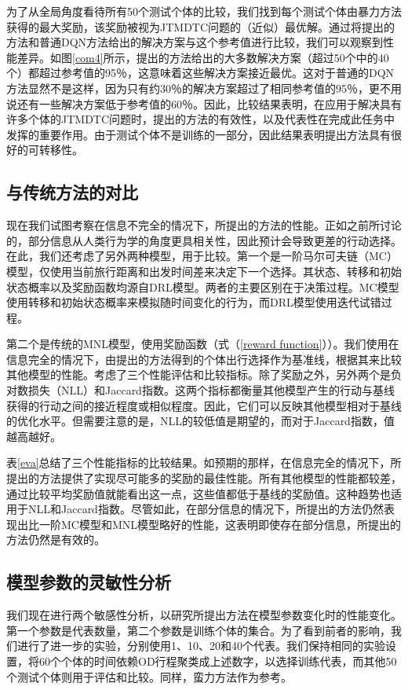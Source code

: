 为了从全局角度看待所有50个测试个体的比较，我们找到每个测试个体由暴力方法获得的最大奖励，该奖励被视为JTMDTC问题的（近似）最优解。通过将提出的方法和普通DQN方法给出的解决方案与这个参考值进行比较，我们可以观察到性能差异。如图\ref{com4}所示，提出的方法给出的大多数解决方案（超过50个中的40个）都超过参考值的95％，这意味着这些解决方案接近最优。这对于普通的DQN方法显然不是这样，因为只有约30％的解决方案超过了相同参考值的95％，更不用说还有一些解决方案低于参考值的60％。因此，比较结果表明，在应用于解决具有许多个体的JTMDTC问题时，提出的方法的有效性，以及代表性在完成此任务中发挥的重要作用。由于测试个体不是训练的一部分，因此结果表明提出方法具有很好的可转移性。

\subsection{与传统方法的对比}

现在我们试图考察在信息不完全的情况下，所提出的方法的性能。正如之前所讨论的，部分信息从人类行为学的角度更具相关性，因此预计会导致更差的行动选择。在此，我们还考虑了另外两种模型，用于比较。第一个是一阶马尔可夫链（MC）模型，仅使用当前旅行距离和出发时间差来决定下一个选择。其状态、转移和初始状态概率以及奖励函数均源自DRL模型。两者的主要区别在于决策过程。MC模型使用转移和初始状态概率来模拟随时间变化的行为，而DRL模型使用迭代试错过程。

第二个是传统的MNL模型，使用奖励函数（式（\ref{reward function}））。我们使用在信息完全的情况下，由提出的方法得到的个体出行选择作为基准线，根据其来比较其他模型的性能。考虑了三个性能评估和比较指标。除了奖励之外，另外两个是负对数损失（NLL）和Jaccard指数。这两个指标都衡量其他模型产生的行动与基线获得的行动之间的接近程度或相似程度。因此，它们可以反映其他模型相对于基线的优化水平。但需要注意的是，NLL的较低值是期望的，而对于Jaccard指数，值越高越好。

表\ref{eva}总结了三个性能指标的比较结果。如预期的那样，在信息完全的情况下，所提出的方法提供了实现尽可能多的奖励的最佳性能。所有其他模型的性能都较差，通过比较平均奖励值就能看出这一点，这些值都低于基线的奖励值。这种趋势也适用于NLL和Jaccard指数。尽管如此，在部分信息的情况下，所提出的方法仍然表现出比一阶MC模型和MNL模型略好的性能，这表明即使存在部分信息，所提出的方法仍然是有效的。

\subsection{模型参数的灵敏性分析}

我们现在进行两个敏感性分析，以研究所提出方法在模型参数变化时的性能变化。第一个参数是代表数量，第二个参数是训练个体的集合。为了看到前者的影响，我们进行了进一步的实验，分别使用1、10、20和40个代表。我们保持相同的实验设置，将60个个体的时间依赖OD行程聚类成上述数字，以选择训练代表，而其他50个测试个体则用于评估和比较。同样，蛮力方法作为参考。

